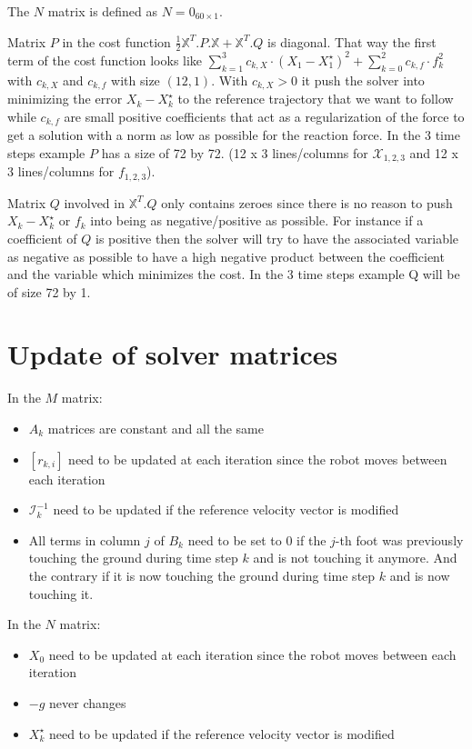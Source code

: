 \documentclass[a4paper,11pt]{article}
\begin{document}
The $N$ matrix is defined as $N = 0_{60 \times 1}$.

Matrix $P$ in the cost function $\frac{1}{2}\mathbb{X}^T.P.\mathbb{X} + \mathbb{X}^T.Q$ is diagonal. That way the first term of the cost function looks like $\sum_{k=1}^{3} c_{k,X} \cdot (X_1 - X_1^\star)^2 + \sum_{k=0}^{2} c_{k,f} \cdot f_k^2$ with $c_{k,X}$ and $c_{k,f}$ with size $(12, 1)$. With $c_{k,X} > 0$ it push the solver into minimizing the error $X_k - X_k^\star$ to the reference trajectory that we want to follow while $c_{k,f}$ are small positive coefficients that act as a regularization of the force to get a solution with a norm as low as possible for the reaction force. In the 3 time steps example $P$ has a size of 72 by 72. (12 x 3 lines/columns for $\mathcal{X}_{1,2,3}$ and 12 x 3 lines/columns for $f_{1,2,3}$).
 

Matrix $Q$ involved in $\mathbb{X}^T.Q$ only contains zeroes since there is no reason to push $X_k - X_k^\star$ or $f_k$ into being as negative/positive as possible. For instance if a coefficient of $Q$ is positive then the solver will try to have the associated variable as negative as possible to have a high negative product between the coefficient and the variable which minimizes the cost. In the 3 time steps example Q will be of size 72 by 1.

\section*{Update of solver matrices}

In the $M$ matrix:
\begin{itemize}
\item $A_k$ matrices are constant and all the same
\item $[r_{k,i}]$ need to be updated at each iteration since the robot moves between each iteration
\item $\mathcal{I}_k^{-1}$ need to be updated if the reference velocity vector is modified
\item All terms in column $j$ of $B_k$ need to be set to 0 if the $j$-th foot was previously touching the ground during time step $k$ and is not touching it anymore. And the contrary if it is now touching the ground during time step $k$ and is now touching it.
\end{itemize}

In the $N$ matrix:
\begin{itemize}
	\item $X_0$ need to be updated at each iteration since the robot moves between each iteration
	\item $- g$ never changes
	\item $X_k^\star$ need to be updated if the reference velocity vector is modified
\end{itemize}
\end{document}
